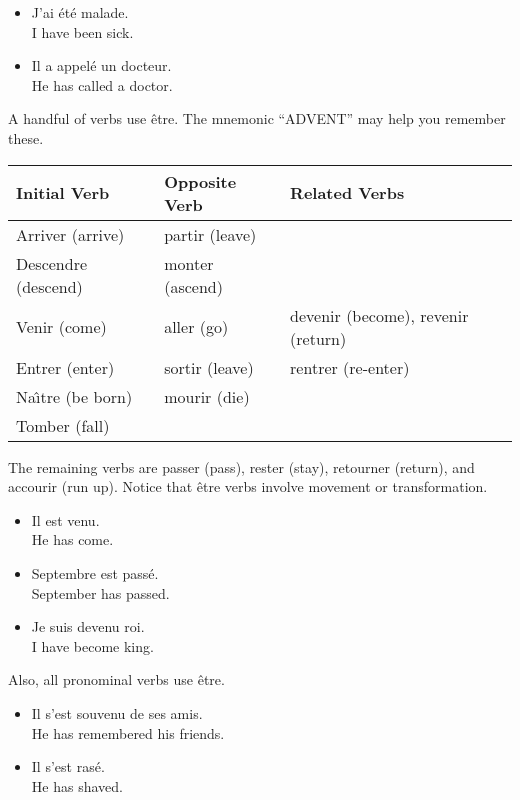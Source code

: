 \begin{itemize}
  \item  J'ai {\'e}t{\'e} malade. \\ I have been sick.
	\item  Il a appel{\'e} un docteur. \\ He has called a doctor.
\end{itemize}

A handful of verbs use {\^e}tre. The mnemonic ``ADVENT'' may help you remember these.

\begin{center}\begin{tabular}{|l|l|l|}
\hline
\textbf{Initial Verb} & \textbf{Opposite Verb} & \textbf{Related Verbs}             \\ \hline
Arriver (arrive)      & partir (leave)         &                                    \\ \hline
Descendre (descend)   & monter (ascend)        &                                    \\ \hline
Venir (come)          & aller (go)             & devenir (become), revenir (return) \\ \hline
Entrer (enter)        & sortir (leave)         & rentrer (re-enter)                 \\ \hline
Na{\^\i}tre (be born)      & mourir (die)           &                                    \\ \hline
Tomber (fall)         &                        &                                    \\ \hline
\end{tabular}\end{center}

The remaining verbs are passer (pass), rester (stay), retourner (return), and accourir (run up). Notice that {\^e}tre verbs involve movement or transformation.

\begin{itemize}
  \item  Il est venu. \\ He has come.
	\item  Septembre est pass{\'e}. \\ September has passed.
	\item  Je suis devenu roi. \\ I have become king.
\end{itemize}

Also, all pronominal verbs use {\^e}tre.


\begin{itemize}
  \item  Il s'est souvenu de ses amis. \\ He has remembered his friends.
	\item  Il s'est ras{\'e}. \\ He has shaved.
\end{itemize}

